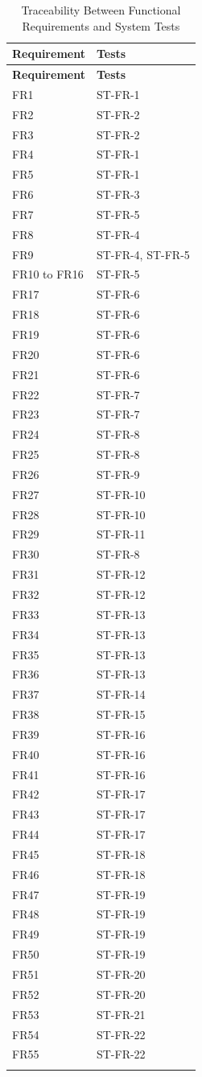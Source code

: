 \documentclass[12pt, titlepage]{article}
\begin{document}
\begin{longtable}{p{} p{}}
\toprule
\textbf{Requirement} & \textbf{Tests}\\
\midrule
\endfirsthead
\toprule
\textbf{Requirement} & \textbf{Tests}\\
\midrule
\endhead
\endfoot
\endlastfoot
FR1 & ST-FR-1\\
FR2 & ST-FR-2\\
FR3 & ST-FR-2\\
FR4 & ST-FR-1\\
FR5 & ST-FR-1\\
FR6 & ST-FR-3\\
FR7 & ST-FR-5\\
FR8 & ST-FR-4\\
FR9 & ST-FR-4, ST-FR-5\\
FR10 to FR16 & ST-FR-5\\
FR17 & ST-FR-6\\
FR18 & ST-FR-6\\
FR19 & ST-FR-6\\
FR20 & ST-FR-6\\
FR21 & ST-FR-6\\
FR22 & ST-FR-7\\
FR23 & ST-FR-7\\
FR24 & ST-FR-8\\
FR25 & ST-FR-8\\
FR26 & ST-FR-9\\
FR27 & ST-FR-10\\
FR28 & ST-FR-10\\
FR29 & ST-FR-11\\
FR30 & ST-FR-8\\
FR31 & ST-FR-12\\
FR32 & ST-FR-12\\
FR33 & ST-FR-13\\
FR34 & ST-FR-13\\
FR35 & ST-FR-13\\
FR36 & ST-FR-13\\
FR37 & ST-FR-14\\
FR38 & ST-FR-15\\
FR39 & ST-FR-16\\
FR40 & ST-FR-16\\
FR41 & ST-FR-16\\
FR42 & ST-FR-17\\
FR43 & ST-FR-17\\
FR44 & ST-FR-17\\
FR45 & ST-FR-18\\
FR46 & ST-FR-18\\
FR47 & ST-FR-19\\
FR48 & ST-FR-19\\
FR49 & ST-FR-19\\
FR50 & ST-FR-19\\
FR51 & ST-FR-20\\
FR52 & ST-FR-20\\
FR53 & ST-FR-21\\
FR54 & ST-FR-22\\
FR55 & ST-FR-22\\
\bottomrule
\caption{Traceability Between Functional Requirements and System Tests}\label{tab:FRTraceability}
\end{longtable}
\end{document}
